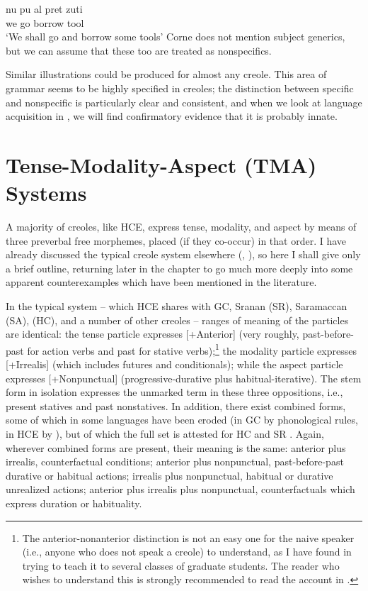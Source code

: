 \ea\label{ex:2:26}
 \gll nu pu al pret zuti\\
we {\IRR} go borrow tool \\
\glt `We shall go and borrow some tools'
\z
Corne does not mention subject generics, but we can assume that these too are treated as nonspecifics.

Similar illustrations could be produced for almost any creole. This area of grammar seems to be highly specified in creoles; the dis\-tinction between specific and nonspecific is particularly clear and consistent, and when we look at language acquisition in , we will find confirmatory evidence that it is probably innate.

\section{Tense-Modality-Aspect (TMA) Systems}

A majority of creoles, like HCE, express tense, modality, and aspect by means of three preverbal free morphemes, placed (if they co-occur) in that order. I have already discussed the typical creole system elsewhere (\citealt{Bickerton1974}, \citeyear[Chapter 2]{Bickerton1975}), so here I shall give only a brief outline, returning later in the chapter to go much more deeply into some apparent counterexamples which have been men\-tioned in the literature.

In the typical system -- which HCE shares with GC, Sranan (SR), Saramaccan (SA),  (HC), and a number of other creoles -- ranges of meaning of the particles are identical: the tense particle ex\-presses [+Anterior] (very roughly, past-before-past for action verbs and past for stative verbs);\footnote{The anterior-nonanterior distinction is not an easy one for the naive speaker (i.e., anyone who does not speak a creole) to under\-stand, as I have found in trying to teach it to several classes of graduate students. The reader who wishes to understand this is strongly recom\-mended to read the account in \citet[Chapter 2]{Bickerton1975}.} the modality particle expresses [+Irrealis] (which includes futures and conditionals); while the aspect particle expresses [+Nonpunctual] (progressive-durative plus habitual-iterative). The stem form in isolation expresses the unmarked term in these three oppositions, i.e., present statives and past nonstatives. In addition, there exist combined forms, some of which in some languages have been eroded (in GC by phonological rules, in HCE by ), but of which the full set is attested for HC \citep{Hall1953} and SR \citep{Voorhoeve1957}. Again, wherever combined forms are present, their meaning is the same: anterior plus irrealis, counterfactual conditions; anterior plus nonpunctual, past-before-past durative or habitual actions; irrealis plus nonpunctual, habitual or durative unrealized actions; anterior plus irrealis plus nonpunctual, counterfactuals which express duration or habituality.

